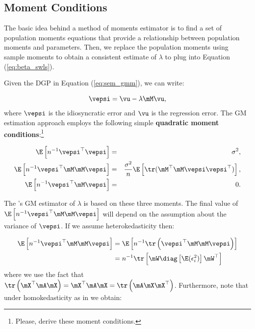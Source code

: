 \documentclass[english,12pt]{book}\usepackage[]{graphicx}\usepackage[]{xcolor}
\begin{document}
\subsection{Moment Conditions}\label{section:Moment_Condtions}

The basic idea behind a method of moments estimator is to find a set of population moments equations that provide a relationship between population moments and parameters. Then, we replace the population moments using sample moments to obtain a consistent estimate of $\lambda$ to plug into Equation (\ref{eq:beta_swls}).

Given the DGP in Equation (\ref{eq:sem_gmm}), we can write: 

\begin{equation*}
  \vepsi = \vu - \lambda\mM\vu,
\end{equation*}
%
where $\vepsi$ is the idiosyncratic error and $\vu$ is the regression error. The GM estimation approach employs the following simple \textbf{quadratic moment conditions}:\footnote{Please, derive these moment conditions.}

\begin{eqnarray*}
  \E\left[n^{-1}\vepsi^\top \vepsi\right] &=& \sigma^2, \\
   \E\left[n^{-1}\vepsi^\top\mM\mM\vepsi\right] &=& \frac{\sigma^2}{n}\E\left[\tr(\mM^\top\mM\vepsi\vepsi^\top) \right],\\
   \E\left[n^{-1}\vepsi^\top \mM \vepsi \right] & = & 0.
\end{eqnarray*}

The \cite{kelejian1999generalized}'s GM estimator of $\lambda$ is based on these three moments. The final value of $\E\left[n^{-1}\vepsi^\top\mM\mM\vepsi\right]$ will depend on the assumption about the variance of $\vepsi$. If we assume heterokedasticity then:

\begin{equation*}
  \begin{aligned}
  \E\left[n^{-1}\vepsi^\top\mM\mM\vepsi\right] & = \E\left[n ^{-1} \tr\left(\vepsi^\top\mM\mM\vepsi\right)\right] \\
                                               &  = n^{-1}\tr\left[\mW\diag\left[\E(\epsilon_i^2)\right]\mW^\top\right]
  \end{aligned}
\end{equation*}
%
where we use the fact that $\tr\left(\mX^\top\mA\mX\right) = \mX^\top\mA\mX = \tr\left(\mA\mX\mX^\top\right)$. Furthermore, note that under homokedasticity as in \cite{kelejian1999generalized} we obtain:
\end{document}
